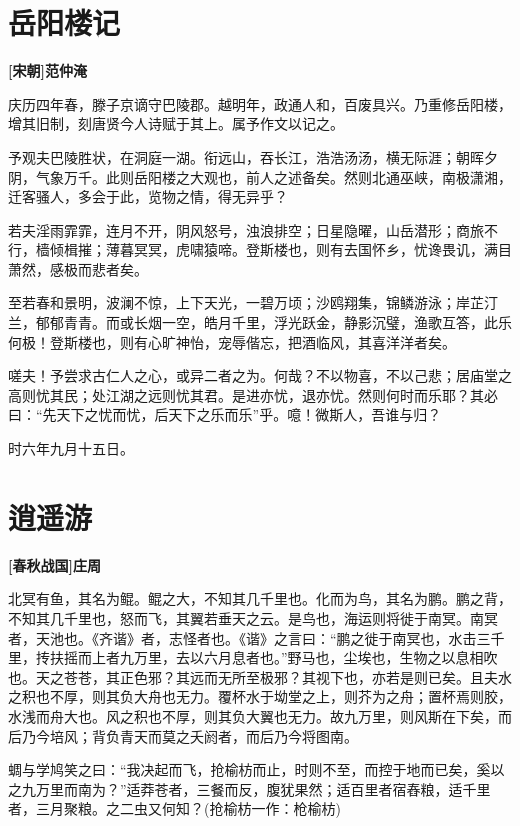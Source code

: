 \documentclass[UTF8,titlepage,oneside]{ctexbook}
\begin{document}
\chapter*{岳阳楼记}
\begin{center}
	\textbf{[宋朝]范仲淹}
\end{center}

庆历四年春，滕子京谪守巴陵郡。越明年，政通人和，百废具兴。乃重修岳阳楼，增其旧制，刻唐贤今人诗赋于其上。属予作文以记之。


予观夫巴陵胜状，在洞庭一湖。衔远山，吞长江，浩浩汤汤，横无际涯；朝晖夕阴，气象万千。此则岳阳楼之大观也，前人之述备矣。然则北通巫峡，南极潇湘，迁客骚人，多会于此，览物之情，得无异乎？


若夫淫雨霏霏，连月不开，阴风怒号，浊浪排空；日星隐曜，山岳潜形；商旅不行，樯倾楫摧；薄暮冥冥，虎啸猿啼。登斯楼也，则有去国怀乡，忧谗畏讥，满目萧然，感极而悲者矣。


至若春和景明，波澜不惊，上下天光，一碧万顷；沙鸥翔集，锦鳞游泳；岸芷汀兰，郁郁青青。而或长烟一空，皓月千里，浮光跃金，静影沉璧，渔歌互答，此乐何极！登斯楼也，则有心旷神怡，宠辱偕忘，把酒临风，其喜洋洋者矣。


嗟夫！予尝求古仁人之心，或异二者之为。何哉？不以物喜，不以己悲；居庙堂之高则忧其民；处江湖之远则忧其君。是进亦忧，退亦忧。然则何时而乐耶？其必曰：“先天下之忧而忧，后天下之乐而乐”乎。噫！微斯人，吾谁与归？


时六年九月十五日。



\chapter*{逍遥游}
\begin{center}
	\textbf{[春秋战国]庄周}
\end{center}

北冥有鱼，其名为鲲。鲲之大，不知其几千里也。化而为鸟，其名为鹏。鹏之背，不知其几千里也，怒而飞，其翼若垂天之云。是鸟也，海运则将徙于南冥。南冥者，天池也。《齐谐》者，志怪者也。《谐》之言曰：“鹏之徙于南冥也，水击三千里，抟扶摇而上者九万里，去以六月息者也。”野马也，尘埃也，生物之以息相吹也。天之苍苍，其正色邪？其远而无所至极邪？其视下也，亦若是则已矣。且夫水之积也不厚，则其负大舟也无力。覆杯水于坳堂之上，则芥为之舟；置杯焉则胶，水浅而舟大也。风之积也不厚，则其负大翼也无力。故九万里，则风斯在下矣，而后乃今培风；背负青天而莫之夭阏者，而后乃今将图南。

蜩与学鸠笑之曰：“我决起而飞，抢榆枋而止，时则不至，而控于地而已矣，奚以之九万里而南为？”适莽苍者，三餐而反，腹犹果然；适百里者宿舂粮，适千里者，三月聚粮。之二虫又何知？(抢榆枋一作：枪榆枋)
\end{document}
